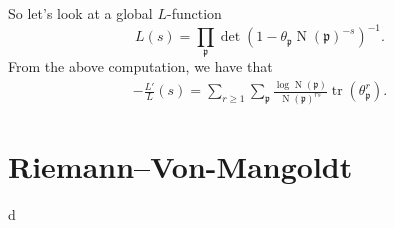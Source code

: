 \documentclass{article}
\DeclareMathOperator{\norm}{N}
\DeclareMathOperator{\trace}{tr}
\newcommand{\fp}{\mathfrak{p}}
\begin{document}
So let's look at a global $L$-function
\[
	L(s) = \prod_\fp \det(1-\theta_\fp \norm(\fp)^{-s})^{-1} .
\]
From the above computation, we have that 
\begin{align*}
	-\frac{L'}{L}(s) = \sum_{r\geqslant 1} \sum_\fp \frac{\log \norm(\fp)}{\norm(\fp)^{r s}} \trace(\theta_\fp^r) .
\end{align*}





\section{Riemann--Von-Mangoldt}

d
\end{document}
